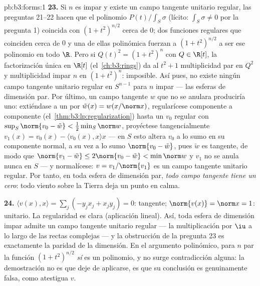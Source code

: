 \begin{solution}{pb:b3:forms:1}
\textbf{23.} Si $n$ es impar y existe un campo tangente unitario
regular, las preguntas 21--22 hacen que el polinomio $P(t)/\int_S\sigma$
(lícito: $\int_S\sigma \neq 0$ por la pregunta 1) coincida con
$(1 + t^2)^{n/2}$ cerca de $0$; dos funciones regulares que coinciden
cerca de $0$ y una de ellas polinómica fuerzan a $(1 + t^2)^{n/2}$ a ser
ese polinomio en todo $\R$. Pero si $Q(t)^2 = (1 + t^2)^n$ con
$Q \in \R[t]$, la factorización única en $\R[t]$ (el~\cref{ch:b3:rings})
da al  $t^2 + 1$
multiplicidad par en $Q^2$ y multiplicidad impar $n$ en $(1 + t^2)^n$:
imposible. Así pues, no existe ningún campo tangente unitario regular en
$S^{n-1}$ para $n$ impar --- las esferas de dimensión par. Por último,
un campo tangente  $w$ que
no se anulara produciría uno: extiéndase a un
 por
$\tilde w(x) = w(x/\norm x)$, regularícese componente a componente
(el~\cref{thm:b3:lp:regularization}) hasta un $v_0$ regular con
$\sup_S\norm{v_0 - \tilde w} <
\frac12\min_S\norm w$, proyéctese tangencialmente $v_1(x) = v_0(x)
- \langle v_0(x), x\rangle x$ --- en $S$ esto altera $v_0$ a lo sumo en
su componente normal, a su vez a lo sumo $\norm{v_0 -
\tilde w}$, pues $\tilde w$ es tangente, de modo que $\norm{v_1 - \tilde
w} \leq 2\norm{v_0 - \tilde w} < \min\norm w$ y $v_1$ no se anula nunca
en $S$ --- y normalícese: $v =
v_1/\norm{v_1}$ es un campo tangente unitario regular. Por tanto, en
toda esfera de dimensión par, \emph{todo campo tangente
 tiene un cero}: todo
viento sobre la Tierra deja un punto en calma.

\textbf{24.} $\langle v(x), x\rangle = \sum_j(-y_jx_j +
x_jy_j) = 0$: tangente; $\norm{v(x)} = \norm x = 1$: unitario. La
regularidad es clara (aplicación lineal). Así, toda esfera de dimensión
impar admite un campo tangente unitario regular --- la multiplicación
por $\iu$ a lo largo de las rectas complejas --- y la obstrucción de la
pregunta 23 es exactamente la paridad de la dimensión. En el argumento
polinómico, para $n$ par la función $(1 +
t^2)^{n/2}$ \emph{sí} es un polinomio, y no surge contradicción alguna:
la demostración no es que deje de aplicarse, es que su conclusión es
genuinamente falsa, como atestigua $v$.


\end{solution}
